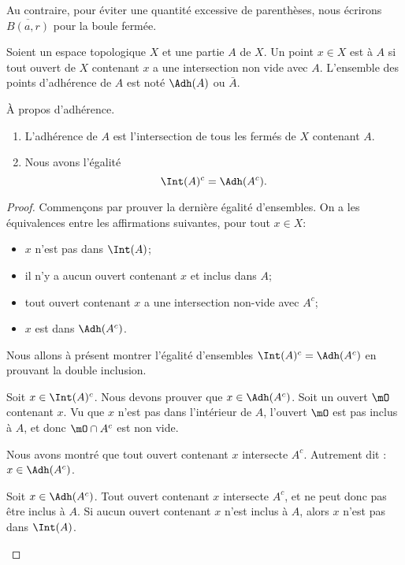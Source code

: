 Au contraire, pour éviter une quantité excessive de parenthèses, nous écrirons \( \overline{ B(a,r) }\) pour la boule fermée.

\begin{definition}      \label{DEFooSVWMooLpAVZR}
	Soient un espace topologique \( X\) et une partie \( A\) de \( X\). Un point \( x\in X\) est  à \( A\) si tout ouvert de \( X\) contenant \( x\) a une intersection non vide avec \( A\). L'ensemble des points d'adhérence de \( A\) est noté \( \Adh(A)\) ou \( \bar A\).
\end{definition}

\begin{lemma}       \label{LEMooILNCooOFZaTe}
	À propos d'adhérence.
	\begin{enumerate}
		\item
		      L'adhérence de \( A\) est l'intersection de tous les fermés de \( X\) contenant \( A\).
		\item
		      Nous avons l'égalité
		      \begin{equation}
			      \Int(A)^c = \Adh(A^c).
		      \end{equation}
	\end{enumerate}
\end{lemma}

\begin{proof}
	Commençons par prouver la dernière égalité d'ensembles. On a les équivalences entre les affirmations suivantes, pour tout \( x \in X\):
	\begin{itemize}
		\item \( x\) n'est pas dans \( \Int(A)\);
		\item il n'y a aucun ouvert contenant \( x\) et inclus dans \( A\);
		\item tout ouvert contenant \( x\) a une intersection non-vide avec \( A^c\);
		\item \( x\) est dans \( \Adh({A^c})\).
	\end{itemize}
	Nous allons à présent montrer l'égalité d'ensembles \( \Int(A)^c=\Adh(A^c) \) en prouvant la double inclusion.
	\begin{subproof}
		Soit \( x\in \Int(A)^c\). Nous devons prouver que \( x\in \Adh(A^c)\). Soit un ouvert \( \mO\) contenant \( x\). Vu que \( x\) n'est pas dans l'intérieur de \( A\), l'ouvert \( \mO\) est pas inclus à \( A\), et donc \( \mO\cap A^c\) est non vide.

		Nous avons montré que tout ouvert contenant \( x\) intersecte \( A^c\). Autrement dit : \( x\in\Adh(A^c)\).


		Soit \( x\in \Adh(A^c)\). Tout ouvert contenant \( x\) intersecte \( A^c\), et ne peut donc pas être inclus à \( A\). Si aucun ouvert contenant \( x\) n'est inclus à \( A\), alors \( x\) n'est pas dans \( \Int(A)\).
	\end{subproof}
\end{proof}

